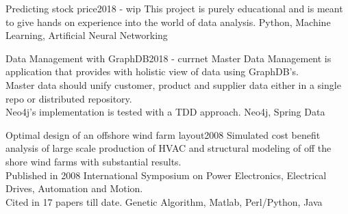 %
%
%


\begin{projects}
	\project
	{Predicting stock price}{2018 - wip}
	{}
	{This project is purely educational and is meant to give hands on experience into the world of data analysis. }
	{Python, Machine Learning, Artificial Neural Networking}
				
	\project
	{Data Management with GraphDB}{2018 - currnet}
	{ }
	{ Master Data Management is application that provides with holistic view of data using GraphDB's. 
	\\ Master data should unify customer, product and supplier data either in a single repo or distributed  repository.
	\\Neo4j's implementation is tested with a TDD approach. }
	{Neo4j, Spring Data}

	\publication
	{Optimal design of an offshore wind farm layout}{2008}
	{ }
	{Simulated cost benefit analysis of large scale production of HVAC and structural modeling of off the shore wind farms with substantial results.
	\\Published in 2008 International Symposium on Power Electronics, Electrical Drives, Automation and Motion. 
	\\Cited in 17 papers till date.}
	{Genetic Algorithm, Matlab, Perl/Python, Java}
	
\end{projects}

